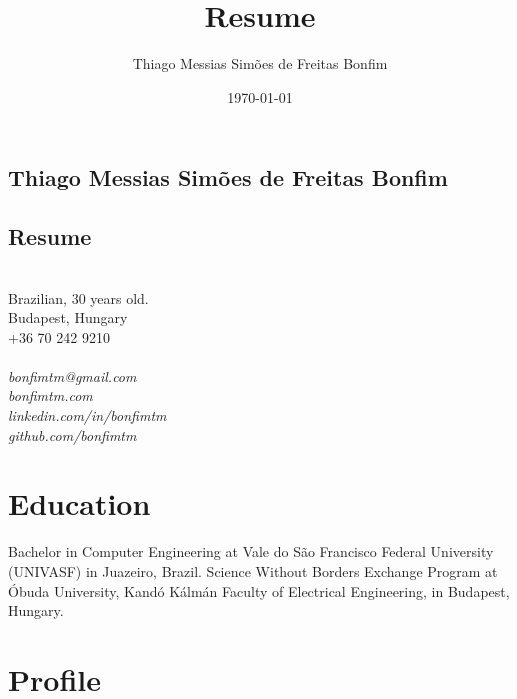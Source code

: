 \documentclass[10pt]{article}
\begin{document}
\title{Resume}

\author{Thiago Messias Simões de Freitas Bonfim}

\date{\today}


\begin{center}

\section*{Thiago Messias Simões de Freitas Bonfim}

\subsection*{Resume}

\noindent\\
Brazilian, 30 years old.\\

Budapest, Hungary\\

+36 70 242 9210\\~\\
\emph{bonfimtm@gmail.com}\\
\emph{bonfimtm.com}\\
\emph{linkedin.com/in/bonfimtm}\\
\emph{github.com/bonfimtm}\\

\end{center}


\section*{Education}

Bachelor in Computer Engineering at Vale do São Francisco Federal University (UNIVASF) in Juazeiro, Brazil. Science Without Borders Exchange Program at Óbuda University, Kandó Kálmán Faculty of Electrical Engineering, in Budapest, Hungary.


\section*{Profile}
\end{document}
